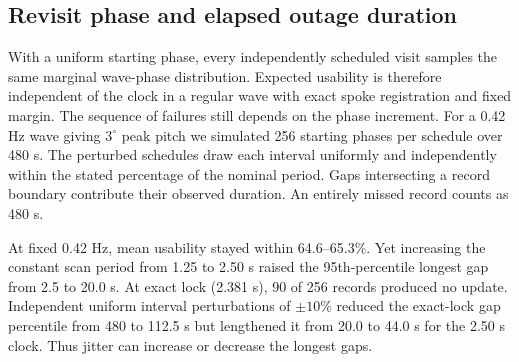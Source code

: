 \subsection{Revisit phase and elapsed outage duration}

With a uniform starting phase, every independently scheduled visit samples the same marginal wave-phase distribution. Expected usability is therefore independent of the clock in a regular wave with exact spoke registration and fixed margin. The sequence of failures still depends on the phase increment. For a 0.42 Hz wave giving $3^\circ$ peak pitch we simulated 256 starting phases per schedule over 480 s. The perturbed schedules draw each interval uniformly and independently within the stated percentage of the nominal period. Gaps intersecting a record boundary contribute their observed duration. An entirely missed record counts as 480 s.

At fixed 0.42 Hz, mean usability stayed within 64.6--65.3\%. Yet increasing the constant scan period from 1.25 to 2.50 s raised the 95th-percentile longest gap from 2.5 to 20.0 s. At exact lock (2.381 s), 90 of 256 records produced no update. Independent uniform interval perturbations of $\pm10\%$ reduced the exact-lock gap percentile from 480 to 112.5 s but lengthened it from 20.0 to 44.0 s for the 2.50 s clock. Thus jitter can increase or decrease the longest gaps.
